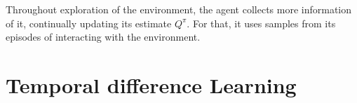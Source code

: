 Throughout exploration of the environment, the agent collects more information of it, continually updating its estimate $Q^\pi$. For that, it uses samples from its episodes of interacting with the environment. %


\section{Temporal difference Learning}



